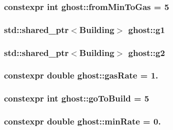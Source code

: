 \hypertarget{namespaceghost_a1accff79c78b223ee8400747204dd3b2}{
\subsubsection[{from\-Min\-To\-Gas}]{\setlength{\rightskip}{0pt plus 5cm}constexpr int ghost\-::from\-Min\-To\-Gas = 5}}\label{namespaceghost_a1accff79c78b223ee8400747204dd3b2}
\hypertarget{namespaceghost_a69c92ddb4f46d01dc2b21ff8b6c7abdd}{
\subsubsection[{g1}]{\setlength{\rightskip}{0pt plus 5cm}std\-::shared\-\_\-ptr$<${\bf Building}$>$ ghost\-::g1}}\label{namespaceghost_a69c92ddb4f46d01dc2b21ff8b6c7abdd}
\hypertarget{namespaceghost_a06d6bb1ff9795198ea63e209711cfc9e}{
\subsubsection[{g2}]{\setlength{\rightskip}{0pt plus 5cm}std\-::shared\-\_\-ptr$<${\bf Building}$>$ ghost\-::g2}}\label{namespaceghost_a06d6bb1ff9795198ea63e209711cfc9e}
\hypertarget{namespaceghost_a080e7a4629484df50f3c1fa938a80181}{
\subsubsection[{gas\-Rate}]{\setlength{\rightskip}{0pt plus 5cm}constexpr double ghost\-::gas\-Rate = 1.}}\label{namespaceghost_a080e7a4629484df50f3c1fa938a80181}
\hypertarget{namespaceghost_a6281c7426908c18212d4d10b999e40bc}{
\subsubsection[{go\-To\-Build}]{\setlength{\rightskip}{0pt plus 5cm}constexpr int ghost\-::go\-To\-Build = 5}}\label{namespaceghost_a6281c7426908c18212d4d10b999e40bc}
\hypertarget{namespaceghost_a093a7f8d4ed6ac0ed8e51ffb3f61d3b3}{
\subsubsection[{min\-Rate}]{\setlength{\rightskip}{0pt plus 5cm}constexpr double ghost\-::min\-Rate = 0.}}\label{namespaceghost_a093a7f8d4ed6ac0ed8e51ffb3f61d3b3}
